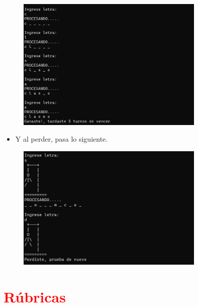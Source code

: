 \documentclass{article}
\begin{document}
	\begin{figure}[H]
		\centering
		\includegraphics[width=0.8\textwidth,keepaspectratio]{img/captura2.png}
	\end{figure}
	\begin{itemize}
		\item Y al perder, pasa lo siguiente.
	\end{itemize}
	\begin{figure}[H]
		\centering
		\includegraphics[width=0.8\textwidth,keepaspectratio]{img/captura3.png}
	\end{figure}
	\section{\textcolor{red}{Rúbricas}}
	
\end{document}
